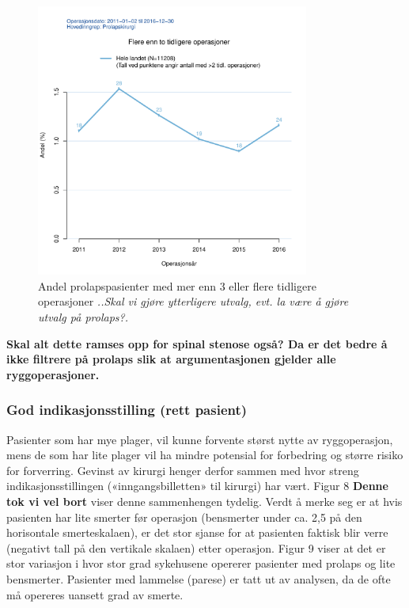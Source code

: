 \documentclass [norsk,a4paper,twoside]{article}\usepackage[]{graphicx}\usepackage[]{color}
\begin{document}
\begin{figure}[ht]
	\centering \includegraphics[width= 0.8\textwidth]{FigTidlOpAnt3.pdf}
	\caption{\label{fig:TidlOpAnt3} Andel prolapspasienter med mer enn 3 eller flere tidligere operasjoner \textit{..Skal vi gjøre ytterligere utvalg, evt. la være å gjøre utvalg på prolaps?.}}
\end{figure}

\textbf{Skal alt dette ramses opp for spinal stenose også? Da er det bedre å ikke filtrere på prolaps slik at argumentasjonen gjelder alle ryggoperasjoner.}


\subsubsection{God indikasjonsstilling (rett pasient)}



Pasienter som har mye plager, vil kunne forvente størst nytte av ryggoperasjon,
mens de som har lite plager vil ha mindre potensial for forbedring og større risiko
for forverring. Gevinst av kirurgi henger derfor sammen med hvor streng
indikasjonsstillingen («inngangsbilletten» til kirurgi) har vært. Figur 8 \textbf{Denne tok vi vel bort} viser denne
sammenhengen tydelig. Verdt å merke seg er at hvis pasienten har lite smerter før
operasjon (bensmerter under ca. 2,5 på den horisontale smerteskalaen), er det stor
sjanse for at pasienten faktisk blir verre (negativt tall på den vertikale skalaen) etter
operasjon. Figur 9 viser at det er stor variasjon i hvor stor grad sykehusene opererer
pasienter med prolaps og lite bensmerter. Pasienter med lammelse (parese) er tatt
ut av analysen, da de ofte må opereres uansett grad av smerte.
\end{document}
